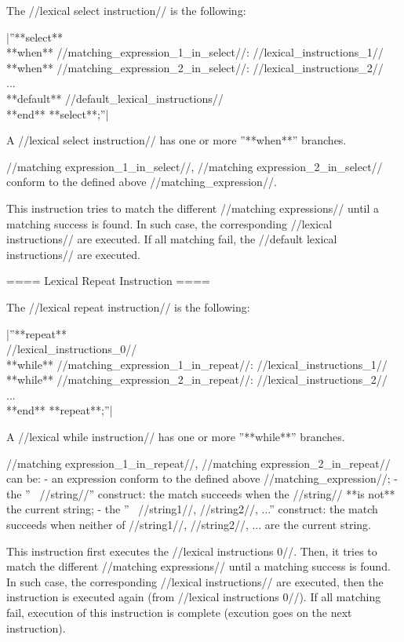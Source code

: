 The //lexical select instruction// is the following:

|''**select**\\ **when** //matching\_expression\_1\_in\_select//: //lexical\_instructions\_1//\\ **when** //matching\_expression\_2\_in\_select//: //lexical\_instructions\_2//\\ ...\\ **default** //default\_lexical\_instructions//\\ **end** **select**;''|

A //lexical select instruction// has one or more ''**when**'' branches.

//matching expression\_1\_in\_select//, //matching expression\_2\_in\_select// conform to the defined above //matching\_expression//.

This instruction tries to match the different //matching expressions// until a matching success is found. In such case, the corresponding //lexical instructions// are executed. If all matching fail, the //default lexical instructions// are executed.

==== Lexical Repeat Instruction ====

The //lexical repeat instruction// is the following:

|''**repeat**\\  //lexical\_instructions\_0//\\ **while** //matching\_expression\_1\_in\_repeat//: //lexical\_instructions\_1//\\ **while** //matching\_expression\_2\_in\_repeat//: //lexical\_instructions\_2//\\ ...\\ **end** **repeat**;''|

A //lexical while instruction// has one or more ''**while**'' branches.

//matching expression\_1\_in\_repeat//, //matching expression\_2\_in\_repeat// can be:
  - an expression conform to the defined above //matching\_expression//;
  - the ''~ //string//'' construct: the match succeeds when the //string// **is not** the current string;
  - the ''~ //string1//, //string2//, ...'' construct: the match succeeds when neither of //string1//, //string2//, ... are the current string.

This instruction first executes the //lexical instructions 0//. Then, it tries to match the different //matching expressions// until a matching success is found. In such case, the corresponding //lexical instructions// are executed, then the instruction is executed again (from //lexical instructions 0//). If all matching fail, execution of this instruction is complete (excution goes on the next instruction).

